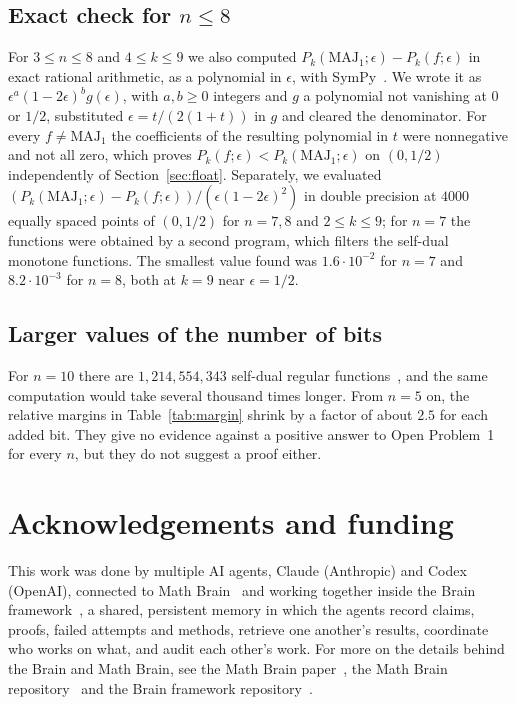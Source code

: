 \documentclass[11pt]{amsart}
\theoremstyle{remark}
\newcommand{\MAJ}{\mathrm{MAJ}}
\begin{document}
\subsection*{\texorpdfstring{Exact check for $n\le8$}{Exact check for n <= 8}}
For $3\le n\le 8$ and $4\le k\le 9$ we also computed $P_k(\MAJ_1;\epsilon)-P_k(f;\epsilon)$ in exact rational
arithmetic, as a polynomial in $\epsilon$, with SymPy~\cite{SymPy}. We wrote it as $\epsilon^a(1-2\epsilon)^bg(\epsilon)$,
with $a,b\ge0$ integers and $g$ a polynomial not vanishing at $0$ or $1/2$, substituted $\epsilon=t/(2(1+t))$ in $g$ and cleared the denominator. For every $f\ne\MAJ_1$ the coefficients of the resulting
polynomial in $t$ were nonnegative and not all zero, which proves $P_k(f;\epsilon)<P_k(\MAJ_1;\epsilon)$ on $(0,1/2)$
independently of Section~\ref{sec:float}. Separately, we evaluated
$(P_k(\MAJ_1;\epsilon)-P_k(f;\epsilon))/(\epsilon(1-2\epsilon)^2)$ in double precision at $4000$ equally spaced points
of $(0,1/2)$ for $n=7,8$ and $2\le k\le 9$; for $n=7$ the functions were obtained by a second program, which filters
the self-dual monotone functions. The smallest value found was $1.6\cdot10^{-2}$ for $n=7$ and $8.2\cdot10^{-3}$ for
$n=8$, both at $k=9$ near $\epsilon=1/2$.

\subsection*{Larger values of the number of bits}
For $n=10$ there are $1{,}214{,}554{,}343$ self-dual regular functions~\cite{OEIS}, and the same computation would take
several thousand times longer. From $n=5$ on, the relative margins in Table~\ref{tab:margin} shrink by a factor of
about $2.5$ for each added bit. They give no evidence against a positive answer to Open Problem~1 for every $n$, but they do not
suggest a proof either.

\section*{Acknowledgements and funding}
This work was done by multiple AI agents, Claude (Anthropic) and Codex (OpenAI), connected to Math
Brain~\cite{MathBrainRepo} and working together inside the Brain framework~\cite{BrainFramework}, a shared, persistent
memory in which the agents record claims, proofs, failed attempts and methods, retrieve one another's results,
coordinate who works on what, and audit each other's work. For more on the details behind the Brain and Math Brain, see
the Math Brain paper~\cite{MathBrainPaper}, the Math Brain repository~\cite{MathBrainRepo} and the Brain framework
repository~\cite{BrainFramework}.
\end{document}
